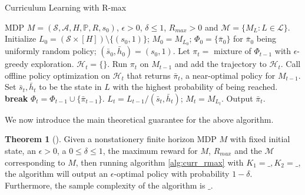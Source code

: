 \documentclass[12pt, letterpaper]{article}
\theoremstyle{definition}
\newtheorem*{thm}{Theorem}
\theoremstyle{remark}
\begin{document}
\begin{algorithm}[H]
    \caption{Curriculum Learning with R-max}
    \label{alg:curr_rmax}
\begin{algorithmic}[1]
    \Require MDP $M = (\mathcal{S}, \mathcal{A}, H, \mathbb{P}, R, s_0)$, $\epsilon > 0$, $\delta \leq 1$, $R_{max} > 0$ and $\mathcal{M} = \{M_L: L \in \mathcal{L}\}$.
    \State Initialize $L_0 = (\mathcal{S} \times [H]) \setminus \{(s_0, 1)\}$; $M_0 = M_{L_0}$; $\Phi_0 = \{\bar\pi_0\}$ for $\bar\pi_0$ being uniformly random policy; $(\bar s_0, \bar h_0) = (s_0, 1)$.
        \State Let $\pi_t =$ mixture of $\Phi_{t-1}$ with $\epsilon$-greedy exploration.
        \State $\mathcal{H}_t = \{\}$.
            \State Run $\pi_t$ on $M_{t-1}$ and add the trajectory to $\mathcal{H}_t$.
        \EndFor
        \State Call offline policy optimization on $\mathcal{H}_t$ that returns $\bar \pi_{t}$, a near-optimal policy for $M_{t-1}$.
            \State Set  $\bar s_t, \bar h_t$ to be the state in \(L\) with the highest probability of being reached.
        \Else
            \State \textbf{break}
        \EndIf
        \State $\Phi_t = \Phi_{t-1} \cup \{\bar \pi_{t-1}\}$.
        \State $L_t = L_{t-1} / (\bar s_t, \bar h_t)$; $M_t = M_{L_t}$.
    \EndFor
    \State Output $\bar \pi_t$.
\end{algorithmic}
\end{algorithm}

We now introduce the main theoretical guarantee for the above algorithm.

\begin{thm}[]
    Given a nonstationery finite horizon MDP \(M\) with fixed initial state, an \(\epsilon > 0\), a \(0 \leq \delta \leq 1\), the maximum reward for \(M\), \(R_{max}\) and the \(\mathcal{M}\) corresponding to \(M\), then running algorithm \ref{alg:curr_rmax} with \(K_1 = \_, K_2 = \_\), the algorithm will output an \(\epsilon\)-optimal policy with probability \(1 - \delta\). Furthermore, the sample complexity of the algorithm is \(\_\).
\end{thm}
\end{document}
